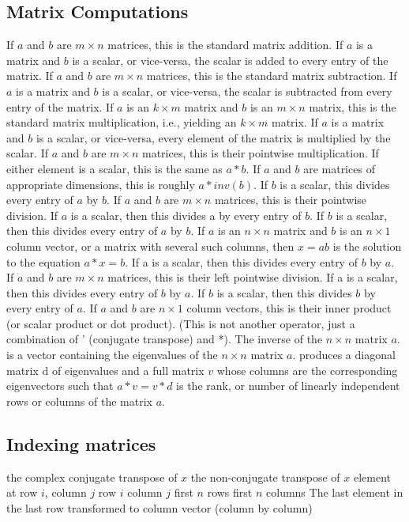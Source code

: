 \subsection{Matrix Computations}{}
	{If $a$ and $b$ are $m \times n$ matrices, this is the standard matrix addition. If $a$ is a matrix and $b$ is a scalar, or vice-versa, the scalar is added to every entry of the matrix.}
	{If $a$ and $b$ are $m \times n$ matrices, this is the standard matrix subtraction. If $a$ is a matrix and $b$ is a scalar, or vice-versa, the scalar is subtracted from every entry of the matrix.}
	{If $a$ is an $k \times m$ matrix and $b$ is an $m \times n$ matrix, this is the standard matrix multiplication, i.e., yielding an $k \times m$ matrix. If $a$ is a matrix and $b$ is a scalar, or vice-versa, every element of the matrix is multiplied by the scalar.}
	{If $a$ and $b$ are $m \times n$ matrices, this is their pointwise multiplication. If either element is a scalar, this is the same as $a*b$.}
	{If $a$ and $b$ are matrices of appropriate dimensions, this is roughly $a*inv(b).$ If $b$ is a scalar, this divides every entry of $a$ by $b$.}
	{If $a$ and $b$ are $m \times n$ matrices, this is their
pointwise division. If $a$ is a scalar, then this divides a by every entry of
$b$. If $b$ is a scalar, then this divides every entry of $a$ by $b$. }
	{If $a$ is an $n \times n$ matrix and $b$ is an $n \times
1$ column vector, or a matrix with several such columns, then $x=a$\bs$b$ is the
solution to the equation $a*x=b$. If a is a scalar, then this divides every
entry of $b$ by $a$.}
	{If $a$ and $b$ are $m \times n$ matrices, this is their
left pointwise division. If a is a scalar, then this divides every entry of $b$
by $a$. If $b$ is a scalar, then this divides $b$ by every entry of $a$.}
	{If $a$ and $b$ are $n \times 1$ column vectors, this is
    their inner product (or scalar product or dot product). (This is not another
    operator, just a combination of ' (conjugate transpose) and *).}
	{The inverse of the $n \times n$ matrix $a$.}
	{is a vector containing the eigenvalues of the $n \times n$ matrix $a$.}
	{produces a diagonal matrix d of eigenvalues and a full
    matrix $v$ whose columns are the corresponding eigenvectors such that $a*v=v*d$}
	{is the rank, or number of linearly independent rows or columns of the matrix $a$.}

\subsection{Indexing matrices}{}
	{the complex conjugate transpose of $x$}
	{the non-conjugate transpose of $x$}
	{element at row $i$, column $j$}
	{row $i$}
	{column $j$}
	{first $n$ rows}
	{first $n$ columns}
	{The last element in the last row}
	{transformed to column vector (column by column)}

